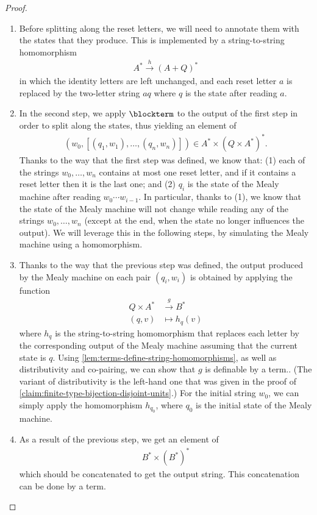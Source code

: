 \begin{proof}
    \begin{enumerate}
        \item Before splitting along the reset letters, we will need to annotate them with the states that they produce. This is implemented by a string-to-string homomorphism  
        \begin{align*}
        A^* \xrightarrow h (A+Q)^*
        \end{align*}
        in which the identity letters are left unchanged, and each  reset letter $a$ is replaced by the two-letter string $aq$ where $q$  is the state  after reading $a$.  
        \item In the second step, we apply $\blockterm$ to  the output of the first step in order to split along the states, thus yielding an element of
        \begin{align*}
         (w_0, [(q_1,w_1),\ldots,(q_n,w_n)]) \in  A^* \times (Q \times A^*)^*.
        \end{align*}
        Thanks to the way that the first step was defined, we know that: (1) each of the strings $w_0,\ldots,w_n$ contains at most one reset letter, and if it contains a reset letter then it is the last one; and  (2)  $q_i$ is the state of the Mealy machine after reading $w_0 \cdots w_{i-1}$. In particular, thanks to (1), we know that the state of the Mealy machine will not change while reading any of the strings $w_0,\ldots,w_n$ (except at the end, when the state no longer influences the output). We will leverage this in the following steps, by simulating the Mealy machine using a homomorphism. 
        \item Thanks to the way that the previous step was defined, the output produced by the Mealy machine on each pair $(q_i,w_i)$ is obtained by applying the function 
        \begin{align*}
                Q \times A^* & \xrightarrow g B^*\\ 
                (q,v) & \mapsto h_q(v)
        \end{align*}
        where $h_q$ is the string-to-string homomorphism that replaces each letter by the corresponding output of the Mealy machine assuming that the current state is $q$.  Using \cref{lem:terms-define-string-homomorphisms}, as well as distributivity and co-pairing, we can show that $g$ is definable by a term.. (The variant of distributivity is the left-hand one that was given in the proof of \cref{claim:finite-type-bijection-disjoint-units}.)  For the initial string $w_0$, we can simply apply the homomorphism $h_{q_0}$, where $q_0$ is the initial state of the Mealy machine.
        \item As a result of the previous step, we get an element of 
            \begin{align*}
            B^* \times (B^*)^*
            \end{align*}
            which should be concatenated to get the output string. This concatenation can be done by a term. 
    \end{enumerate}
\end{proof}

